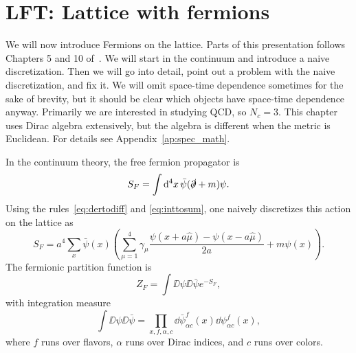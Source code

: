 \chapter{LFT: Lattice with fermions}
We will now introduce Fermions on the lattice. Parts of this presentation 
follows Chapters 5 and 10 of~\cite{gattringer_quantum_2010}. 
We will start in the continuum
and introduce a naive discretization. Then we will go into detail, point
out a problem with the naive discretization, and fix it. We will omit
space-time dependence sometimes for the sake of brevity, but it should
be clear which objects have space-time dependence anyway. Primarily
we are interested in studying QCD, so $N_c=3$. This chapter uses Dirac
algebra extensively, but the algebra is different when the metric
is Euclidean. For details see Appendix~\ref{ap:spec_math}.

In the continuum theory, the free fermion propagator is
\begin{equation}
  S_F=\int\dd[4]{x}\bar{\psi}(\slashed{\partial}+m)\psi.
\end{equation}
Using the rules~\eqref{eq:dertodiff} and \eqref{eq:inttosum}, one naively
discretizes this action on the lattice as
\begin{equation}\label{eq:naivefermact}
  S_F=a^4\sum_x\bar{\psi}(x)\left(\sum_{\mu=1}^4\gamma_\mu
       \frac{\psi(x+a\hat{\mu})-\psi(x-a\hat{\mu})}{2a}
       +m\psi(x)\right).
\end{equation}
The fermionic partition function is
\begin{equation}
  Z_F=\int\DD{\psi}\DD{\bar{\psi}}e^{-S_F},
\end{equation}
with integration measure
\begin{equation}
  \int\DD{\psi}\DD{\bar{\psi}}
   =\prod_{x,f,\alpha,c}\dd{\bar{\psi}^f_{\alpha c}(x)}
                        \dd{\psi^f_{\alpha c}(x)},
\end{equation}
where $f$ runs over flavors, $\alpha$ runs over Dirac indices, and $c$
runs over colors.

